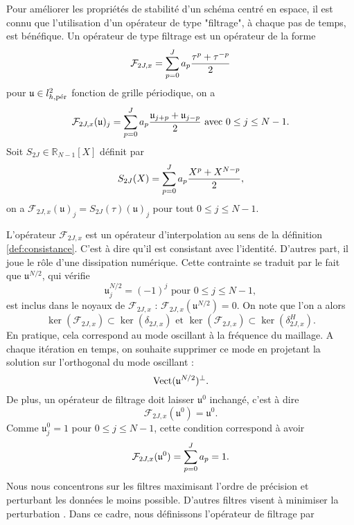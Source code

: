 Pour améliorer les propriétés de stabilité d'un schéma centré en espace, il est connu que l'utilisation d'un opérateur de type "filtrage", à chaque pas de temps, est bénéfique. Un opérateur de type filtrage est un opérateur de la forme
\begin{equation}
\mathcal{F}_{2J,x} = \gsum_{p=0}^J a_p \dfrac{\tau^p + \tau^{-p}}{2}
\label{eq:ftr}
\end{equation}
pour $\mathfrak{u} \in l^2_{h,\per}$ fonction de grille périodique, on a
\begin{equation}
\mathcal{F}_{2J,x} (\mathfrak{u} )_j = \gsum_{p=0}^J a_p \dfrac{\mathfrak{u}_{j+p} + \mathfrak{u}_{j-p}}{2} \text{ avec } 0  \leq j \leq N-1.
\end{equation}
Soit $S_{2J} \in \mathbb{R}_{N-1}[X]$ définit par 
\begin{equation}
S_{2J}(X) = \gsum_{p=0}^J a_p \dfrac{X^p + X^{N-p}}{2},
\label{eq:pol_filtrage}
\end{equation}
on a $\mathcal{F}_{2J,x}(\mathfrak{u})_j = S_{2J}(\tau)(\mathfrak{u})_j$ pour tout $0 \leq j \leq N-1$.

L'opérateur $\mathcal{F}_{2J,x}$ est un opérateur d'interpolation au sens de la définition \ref{def:consistance}. C'est à dire qu'il est consistant avec l'identité.
D'autres part, il joue le rôle d'une dissipation numérique. Cette contrainte se traduit par le fait que $\mathfrak{u}^{N/2}$, qui vérifie
\begin{equation}
\mathfrak{u}^{N/2}_j = (-1)^j \text{ pour } 0 \leq j \leq N-1,
\end{equation}
est inclus dans le noyaux de $\mathcal{F}_{2J,x}$ : $\mathcal{F}_{2J,x}(\mathfrak{u}^{N/2}) = \mathfrak{0}$. On note que l'on a alors
\begin{equation}
\ker (\mathcal{F}_{2J,x} ) \subset \ker (\delta_{2J,x} ) \text{ et } \ker (\mathcal{F}_{2J,x} ) \subset \ker (\delta_{2J,x}^H ).
\end{equation}
En pratique, cela correspond au mode oscillant à la fréquence du maillage. A chaque itération en temps, on souhaite supprimer ce mode en projetant la solution sur l'orthogonal du mode oscillant :
\begin{equation}
\Vect (\mathfrak{u}^{N/2})^{\perp}.
\end{equation}
De plus, un opérateur de filtrage doit laisser $\mathfrak{u}^0$ inchangé, c'est à dire
\begin{equation}
\mathcal{F}_{2J,x}(\mathfrak{u}^{0}) = \mathfrak{u}^{0}.
\end{equation}
Comme $\mathfrak{u}^0_j = 1$ pour $0 \leq j \leq N-1$, cette condition correspond à avoir
\begin{equation}
\mathcal{F}_{2J,x}(\mathfrak{u}^{0}) = \gsum_{p=0}^J a_p = 1.
\end{equation}
Nous nous concentrons sur les filtres maximisant l'ordre de précision \cite{Redonnet2001} et perturbant les données le moins possible. D'autres filtres visent à minimiser la perturbation \cite{Bogey2004}. Dans ce cadre, nous définissons l'opérateur de filtrage par 

